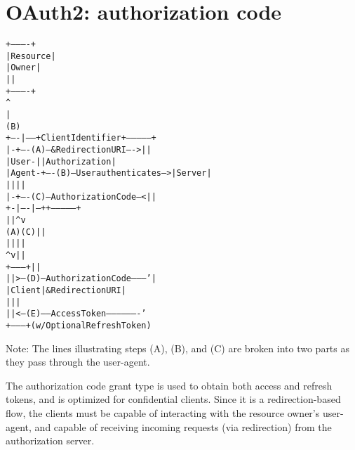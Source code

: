 \section{OAuth2: authorization code}
\begin{alltt}
     +----------+
     | Resource |
     |   Owner  |
     |          |
     +----------+
          ^
          |
         (B)
     +----|-----+          Client Identifier      +---------------+
     |         -+----(A)-- & Redirection URI ---->|               |
     |  User-   |                                 | Authorization |
     |  Agent  -+----(B)-- User authenticates --->|     Server    |
     |          |                                 |               |
     |         -+----(C)-- Authorization Code ---<|               |
     +-|----|---+                                 +---------------+
       |    |                                         ^      v
      (A)  (C)                                        |      |
       |    |                                         |      |
       ^    v                                         |      |
     +---------+                                      |      |
     |         |>---(D)-- Authorization Code ---------'      |
     |  Client |          & Redirection URI                  |
     |         |                                             |
     |         |<---(E)----- Access Token -------------------'
     +---------+       (w/ Optional Refresh Token)

 \end{alltt}
Note: The lines illustrating steps (A), (B), and (C) are broken into
two parts as they pass through the user-agent.


The authorization code grant type is used to obtain both access and refresh
tokens, and is optimized for confidential clients.
Since it is a redirection-based flow, the clients must be capable of interacting
with the resource owner's user-agent, and capable of receiving incoming requests
(via redirection) from the authorization server.

